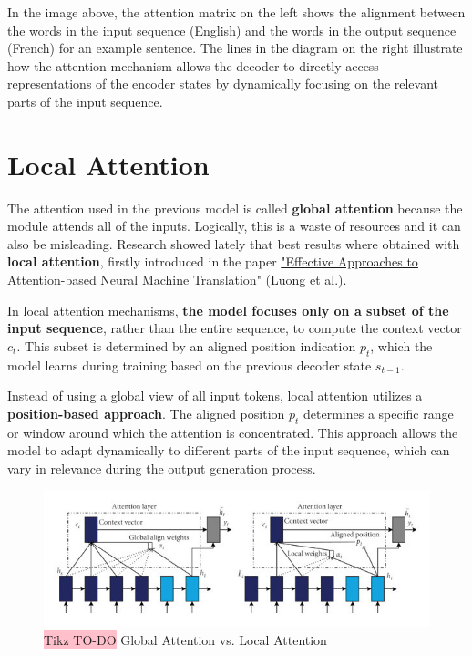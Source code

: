 In the image above, the attention matrix on the left shows the alignment between the words in the input sequence (English) and the words in the output sequence (French) for an example sentence. The lines in the diagram on the right illustrate how the attention mechanism allows the decoder to directly access representations of the encoder states by dynamically focusing on the relevant parts of the input sequence.


\section{Local Attention}

The attention used in the previous model is called \textbf{global attention} because the module attends all of the inputs. Logically, this is a waste of resources and it can also be misleading. Research showed lately that best results where obtained with \textbf{local attention}, firstly introduced in the paper \href{https://arxiv.org/pdf/1508.04025}{"Effective Approaches to Attention-based Neural Machine Translation" (Luong et al.)}.

In local attention mechanisms, \textbf{the model focuses only on a subset of the input sequence}, rather than the entire sequence, to compute the context vector $c_t$. This subset is determined by an aligned position indication $p_t$, which the model learns during training based on the previous decoder state $s_{t-1}$.

Instead of using a global view of all input tokens, local attention utilizes a \textbf{position-based approach}. The aligned position $p_t$ determines a specific range or window around which the attention is concentrated. This approach allows the model to adapt dynamically to different parts of the input sequence, which can vary in relevance during the output generation process.

\begin{figure}[!htbp]
    \centering
    \includegraphics[width=\linewidth]{tikz/chapter7 - Local Attention Comparison.png}
    \caption{{\color{red}\colorbox{pink}{Tikz TO-DO}} Global Attention vs. Local Attention}
\end{figure}

